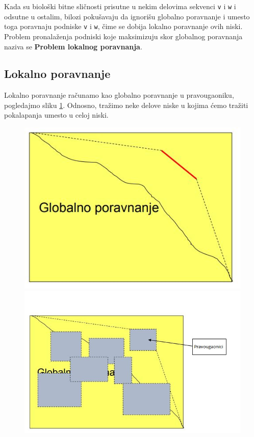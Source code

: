 Kada su biološki bitne sličnosti prisutne u nekim delovima sekvenci \texttt{v} i \texttt{w} i odsutne u ostalim, bilozi pokušavaju da ignorišu globalno poravnanje i umesto toga poravnaju podniske  \texttt{v} i \texttt{w}, čime se dobija lokalno poravnanje ovih niski. Problem pronalaženja podniski koje maksimizuju skor globalnog poravnanja naziva se \textbf{Problem lokalnog poravnanja}.


\subsection{Lokalno poravnanje}

Lokalno poravnanje računamo kao globalno poravnanje u pravougaoniku, pogledajmo sliku \ref{slika:pravougaonici}. Odnosno, tražimo neke delove niske u kojima ćemo tražiti pokalapanja umesto u celoj niski.

\begin{figure}[H]
 \begin{minipage}{0.35\textwidth}
    \includegraphics[width=\linewidth]{poglavlja/5/slike/lokalno_poravnanje_pravougaonici1.JPG}
   \caption{}\label{}
 \end{minipage}
 \hfill
 \begin{minipage}{0.45\textwidth}
   \includegraphics[width=\linewidth]{poglavlja/5/slike/lokalno_poravnanje_pravougaonici2.JPG}
   \caption{}\label{slika:pravougaonici}
 \end{minipage}
\end{figure}

